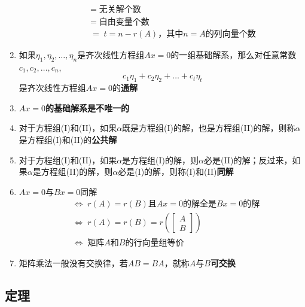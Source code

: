 \documentclass[a4paper,12pt]{article}
\begin{document}
\begin{enumerate}
\begin{enumerate}
            \begin{align*}
                &= \; \text{无关解个数} \\
                &= \; \text{自由变量个数} \\
                &= \; t = n - r(A)\text{，其中}n = A\text{的列向量个数}
            \end{align*}
        \end{enumerate}
        \item 如果$\eta_1, \eta_2, \dots, \eta_n$是齐次线性方程组$Ax = 0$的一组基础解系，那么对任意常数$c_1, c_2, \dots, c_n$,
        \[
            c_{1}\eta_1 + c_{2}\eta_2 + \dots + c_{t}\eta_t
        \]
        是齐次线性方程组$Ax = 0$的\textbf{通解}
        \item $Ax = 0$\textbf{的基础解系是不唯一的}
        \item 对于方程组(I)和(II)，如果$\alpha$既是方程组(I)的解，也是方程组(II)的解，则称$\alpha$是方程组(I)和(II)的\textbf{公共解}
        \item 对于方程组(I)和(II)，如果$\alpha$是方程组(I)的解，则$\alpha$必是(II)的解；反过来，如果$\alpha$是方程组(II)的解，则$\alpha$必是(I)的解，则称(I)和(II)\textbf{同解}
        \item $Ax = 0$与$Bx = 0$同解
        \begin{align*}
            &\Leftrightarrow\; r(A) = r(B)\text{且}Ax = 0 \text{的解全是} Bx = 0\text{的解} \\
            &\Leftrightarrow\; r(A) = r(B) = r\!\left(\begin{bmatrix}
                                                          A \\ B
            \end{bmatrix}\right) \\
            &\Leftrightarrow\; \text{矩阵}A\text{和}B\text{的行向量组等价}
        \end{align*}
        \item 矩阵乘法一般没有交换律，若$AB = BA$，就称$A$与$B$\textbf{可交换}
    \end{enumerate}

    \subsection{定理}
\end{document}
